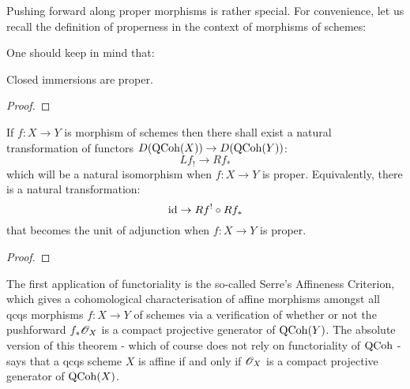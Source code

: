             \begin{definition} \label{def: dual_stable_(infinity, 1)_categories}
                
            \end{definition}
            
            Pushing forward along proper morphisms is rather special. For convenience, let us recall the definition of properness in the context of morphisms of schemes:
            \begin{definition} \label{def: proper_morphisms}
                
            \end{definition}
            One should keep in mind that:
            \begin{example}
                Closed immersions are proper.
            \end{example}
            \begin{lemma} \label{lemma: dualising_complexes_and_properly_supported_cohomology}
                
            \end{lemma}
                \begin{proof}
                    
                \end{proof}
            \begin{theorem} \label{theorem: proper_pushforwards}
                If $f: X \to Y$ is morphism of schemes then there shall exist a natural transformation of functors $D(\mathrm{QCoh}(X)) \to D(\mathrm{QCoh}(Y))$:
                    $$Lf_! \to Rf_*$$
                which will be a natural isomorphism when $f: X \to Y$ is proper. Equivalently, there is a natural transformation:
                    $$\mathrm{id} \to Rf^! \circ Rf_*$$
                that becomes the unit of adjunction when $f: X \to Y$ is proper. 
            \end{theorem}
                \begin{proof}
                    
                \end{proof}

            The first application of functoriality is the so-called Serre's Affineness Criterion, which gives a cohomological characterisation of affine morphisms amongst all qcqs morphisms $f: X \to Y$ of schemes via a verification of whether or not the pushforward $f_*\mathscr{O}_X$ is a compact projective generator of $\mathrm{QCoh}(Y)$. The absolute version of this theorem - which of course does not rely on functoriality of $\mathrm{QCoh}$ - says that a qcqs scheme $X$ is affine if and only if $\mathscr{O}_X$ is a compact projective generator of $\mathrm{QCoh}(X)$.
            
